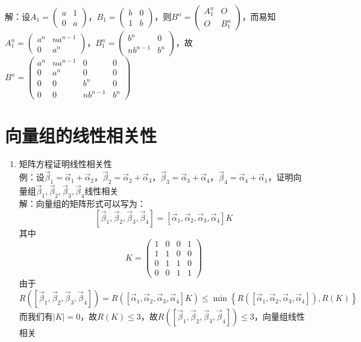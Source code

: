 \documentclass[12pt,a4paper,UTF8]{book}
\begin{document}
\begin{enumerate}
解：设$A_1=\begin{pmatrix}a&1\\0&a\end{pmatrix}$，$B_1=\begin{pmatrix}b&0\\1&b\end{pmatrix}$，则$B^n=\begin{pmatrix}A_1^n&O\\O&B_1^n\end{pmatrix}$，而易知$A_1^n=\begin{pmatrix}a^n&na^{n-1}\\0&a^n\end{pmatrix}$，$B_1^n=\begin{pmatrix}b^n&0\\nb^{n-1}&b^n\end{pmatrix}$，故$B^n=\begin{pmatrix}a^n&na^{n-1}&0&0\\0&a^n&0&0\\0&0&b^n&0\\0&0&nb^{n-1}&b^n\end{pmatrix}$
\end{enumerate}


\section{向量组的线性相关性}
\begin{enumerate}
\item 矩阵方程证明线性相关性\\
例：设$\vec{\beta}_1=\vec{\alpha}_1+\vec{\alpha}_2$，$\vec{\beta}_2=\vec{\alpha}_2+\vec{\alpha}_3$，$\vec{\beta}_3=\vec{\alpha}_3+\vec{\alpha}_4$，$\vec{\beta}_4=\vec{\alpha}_4+\vec{\alpha}_1$，证明向量组$\vec{\beta}_1,\vec{\beta}_2,\vec{\beta}_3,\vec{\beta}_4$线性相关\\
解：向量组的矩阵形式可以写为：
\[\left[\vec{\beta}_1,\vec{\beta}_2,\vec{\beta}_3,\vec{\beta}_4\right]=\left[\vec{\alpha}_1,\vec{\alpha}_2,\vec{\alpha}_3,\vec{\alpha}_4\right]K\]
其中
\[K=\begin{pmatrix}1&0&0&1\\1&1&0&0\\0&1&1&0\\0&0&1&1\end{pmatrix}\]
由于
\[R\left(\left[\vec{\beta}_1,\vec{\beta}_2,\vec{\beta}_3,\vec{\beta}_4\right]\right)=R\left(\left[\vec{\alpha}_1,\vec{\alpha}_2,\vec{\alpha}_3,\vec{\alpha}_4\right]K\right)\leq\min\left\{R\left(\left[\vec{\alpha}_1,\vec{\alpha}_2,\vec{\alpha}_3,\vec{\alpha}_4\right]\right),R\left(K\right)\right\}\]
而我们有$\left|K\right|=0$，故$R\left(K\right)\leq3$，故$R\left(\left[\vec{\beta}_1,\vec{\beta}_2,\vec{\beta}_3,\vec{\beta}_4\right]\right)\leq3$，向量组线性相关
\end{enumerate}
\end{document}
